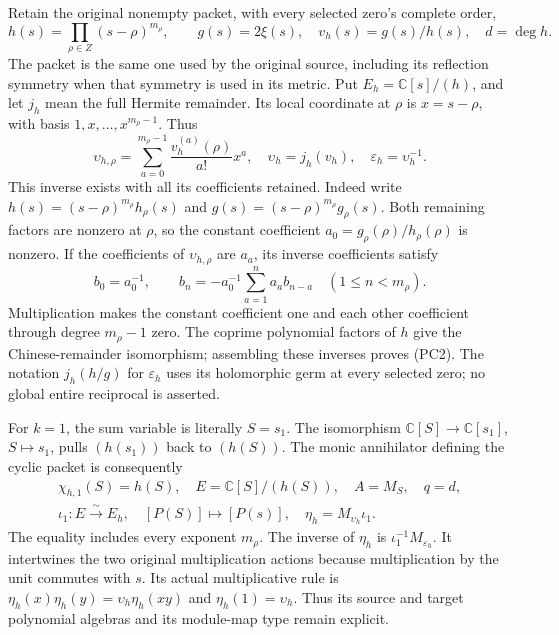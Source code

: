 Retain the original nonempty packet, with every selected zero's complete
order,
\[
 h(s)=\prod_{\rho\in Z}(s-\rho)^{m_\rho},\qquad
 g(s)=2\xi(s),\quad v_h(s)=g(s)/h(s),\quad d=\deg h.
 \tag{PC1}
\]
The packet is the same one used by the original source, including its
reflection symmetry when that symmetry is used in its metric.  Put
$E_h=\mathbb C[s]/(h)$, and let $j_h$ mean the full Hermite remainder.
Its local coordinate at $\rho$ is $x=s-\rho$, with basis
$1,x,\ldots,x^{m_\rho-1}$.  Thus
\[
 \upsilon_{h,\rho}
   =\sum_{a=0}^{m_\rho-1}\frac{v_h^{(a)}(\rho)}{a!}x^a,
 \quad\upsilon_h=j_h(v_h),\quad
 \varepsilon_h=\upsilon_h^{-1}.
 \tag{PC2}
\]
This inverse exists with all its coefficients retained.  Indeed write
$h(s)=(s-\rho)^{m_\rho}h_\rho(s)$ and
$g(s)=(s-\rho)^{m_\rho}g_\rho(s)$.  Both remaining factors are nonzero
at $\rho$, so the constant coefficient
$a_0=g_\rho(\rho)/h_\rho(\rho)$ is nonzero.  If the coefficients
of $\upsilon_{h,\rho}$ are $a_a$, its inverse coefficients satisfy
\[
 b_0=a_0^{-1},\qquad
 b_n=-a_0^{-1}\sum_{a=1}^n a_a b_{n-a}\quad(1\le n<m_\rho).
 \tag{PC3}
\]
Multiplication makes the constant coefficient one and each other
coefficient through degree $m_\rho-1$ zero.  The coprime polynomial
factors of $h$ give the Chinese-remainder isomorphism; assembling these
inverses proves (PC2).  The notation $j_h(h/g)$ for $\varepsilon_h$
uses its holomorphic germ at every selected zero; no global entire
reciprocal is asserted.

For $k=1$, the sum variable is literally $S=s_1$.  The isomorphism
$\mathbb C[S]\to\mathbb C[s_1]$, $S\mapsto s_1$, pulls
$(h(s_1))$ back to $(h(S))$.  The monic annihilator defining the
cyclic packet is consequently
\[
 \begin{gathered}
 \chi_{h,1}(S)=h(S),\quad E=\mathbb C[S]/(h(S)),\quad
 A=M_S,\quad q=d,\\
 \iota_1:E\xrightarrow{\sim}E_h,\quad[P(S)]\mapsto[P(s)],
 \quad\eta_h=M_{\upsilon_h}\iota_1.
 \end{gathered}
 \tag{PC4}
\]
The equality includes every exponent $m_\rho$.  The inverse of
$\eta_h$ is $\iota_1^{-1}M_{\varepsilon_h}$.  It intertwines the
two original multiplication actions because multiplication by the unit
commutes with $s$.  Its actual multiplicative rule is
$\eta_h(x)\eta_h(y)=\upsilon_h\eta_h(xy)$ and
$\eta_h(1)=\upsilon_h$.  Thus its source and target polynomial
algebras and its module-map type remain explicit.

